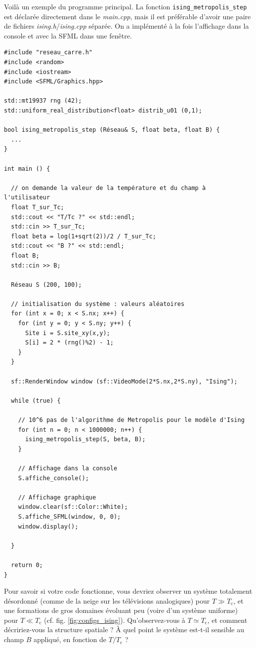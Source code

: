 \documentclass{book}
\newcommand{\inline}[1]{\texttt{#1}}
\def\filename{\emph}
\begin{document}
\begin{correction}
Voilà un exemple du programme principal. La fonction \inline{ising_metropolis_step} est déclarée directement dans le \filename{main.cpp}, mais il est préférable d'avoir une paire de fichiers \filename{ising.h}/\filename{ising.cpp} séparée. On a implémenté à la fois l'affichage dans la console et avec la SFML dans une fenêtre.
\begin{verbatim}
#include "reseau_carre.h"
#include <random>
#include <iostream>
#include <SFML/Graphics.hpp>

std::mt19937 rng (42);
std::uniform_real_distribution<float> distrib_u01 (0,1);

bool ising_metropolis_step (Réseau& S, float beta, float B) {
  ...
}

int main () {

  // on demande la valeur de la température et du champ à l'utilisateur
  float T_sur_Tc;
  std::cout << "T/Tc ?" << std::endl;
  std::cin >> T_sur_Tc;
  float beta = log(1+sqrt(2))/2 / T_sur_Tc;
  std::cout << "B ?" << std::endl;
  float B;
  std::cin >> B;

  Réseau S (200, 100);

  // initialisation du système : valeurs aléatoires
  for (int x = 0; x < S.nx; x++) {
    for (int y = 0; y < S.ny; y++) {
      Site i = S.site_xy(x,y);
      S[i] = 2 * (rng()%2) - 1;
    }
  }

  sf::RenderWindow window (sf::VideoMode(2*S.nx,2*S.ny), "Ising");

  while (true) {

    // 10^6 pas de l'algorithme de Metropolis pour le modèle d'Ising
    for (int n = 0; n < 1000000; n++) {
      ising_metropolis_step(S, beta, B);
    }
    
    // Affichage dans la console
    S.affiche_console();

    // Affichage graphique
    window.clear(sf::Color::White);
    S.affiche_SFML(window, 0, 0);
    window.display();

  }

  return 0;
}
\end{verbatim}
\end{correction}

Pour savoir si votre code fonctionne, vous devriez observer un système totalement désordonné (comme de la neige sur les télévisions analogiques) pour $T \gg T_\text{c}$, et une formations de gros domaines évoluant peu (voire d'un système uniforme) pour $T \ll T_\text{c}$ (cf. fig. \ref{fig:configs_ising}). Qu'observez-vous à $T \simeq T_\text{c}$, et comment décririez-vous la structure spatiale ? À quel point le système est-t-il sensible au champ $B$ appliqué, en fonction de $T/T_\text{c}$ ?\\
\end{document}
